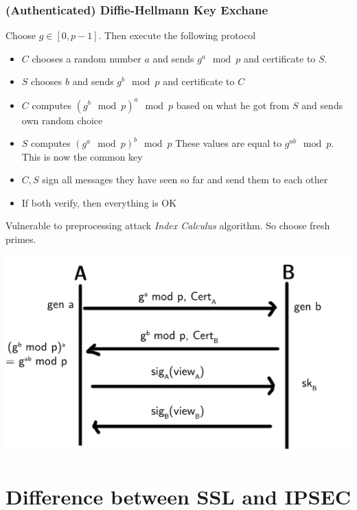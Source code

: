     \begin{frame}
           \frametitle{(Authenticated) Diffie-Hellmann Key Exchane}
            Choose $g \in [0, p-1]$. Then execute the following protocol
            \begin{itemize}
                \item $C$ chooses a random number $a$ and sends $g^a \mod p$ and certificate to $S$. 
                \item $S$ chooses $b$ and sends $g^b \mod p$ and certificate to $C$
                \item $C$ computes $(g^b \mod p)^a \mod p$ based on what he got from $S$ and sends own random choice
                \item $S$ computes $(g^a \mod p)^b \mod p$ These values are equal to $g^{ab} \mod p$. This is now the common key
                \item $C, S$ sign all messages they have seen so far and send them to each other
                \item If both verify, then everything is OK
            \end{itemize}
            Vulnerable to preprocessing attack \textit{Index Calculus} algorithm. So choose fresh primes.
    \end{frame}

    \begin{frame}
        \includegraphics[width=\textwidth]{content/diffie-helmann.pdf}
    \end{frame}

\section{Difference between SSL and IPSEC}

